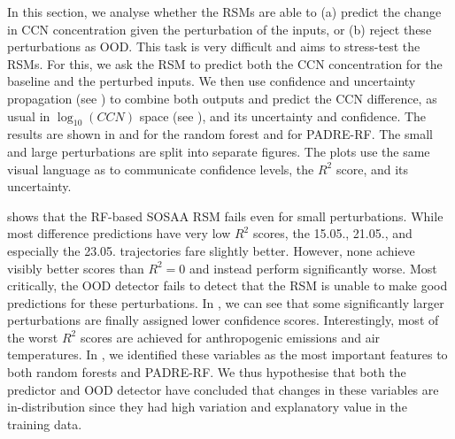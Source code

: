 In this section, we analyse whether the RSMs are able to (a) predict the change in CCN concentration given the perturbation of the inputs, or (b) reject these perturbations as OOD. This task is very difficult and aims to stress-test the RSMs. For this, we ask the RSM to predict both the CCN concentration for the baseline and the perturbed inputs. We then use confidence and uncertainty propagation (see ) to combine both outputs and predict the CCN difference, as usual in $\log_{10}(CCN)$ space (see ), and its uncertainty and confidence. The results are shown in  and  for the random forest and  for PADRE-RF. The small and large perturbations are split into separate figures. The plots use the same visual language as  to communicate confidence levels, the $R^2$ score, and its uncertainty.

\newpar {} shows that the RF-based SOSAA RSM fails even for small perturbations. While most difference predictions have very low $R^2$ scores, the 15.05., 21.05., and especially the 23.05. trajectories fare slightly better. However, none achieve visibly better scores than $R^2 = 0$ and instead perform significantly worse. Most critically, the OOD detector fails to detect that the RSM is unable to make good predictions for these perturbations. In , we can see that some significantly larger perturbations are finally assigned lower confidence scores. Interestingly, most of the worst $R^2$ scores are achieved for anthropogenic emissions and air temperatures. In , we identified these variables as the most important features to both random forests and PADRE-RF. We thus hypothesise that both the predictor and OOD detector have concluded that changes in these variables are in-distribution since they had high variation and explanatory value in the training data.

